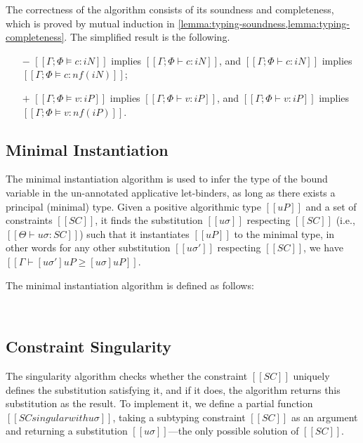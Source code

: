 \documentclass[acmsmall,natbib=false,review,anonymous]{acmart}
\begin{document}
The correctness of the algorithm consists of its soundness and 
completeness, which is proved by mutual
induction in \cref{lemma:typing-soundness,lemma:typing-completeness}.
The simplified result is the following.
\begin{theorempreview}
  \hfill
  \begin{itemize}
    \item [$-$] $[[Γ; Φ ⊨ c : iN]]$ implies $[[Γ; Φ ⊢ c : iN]]$, 
      and $[[Γ; Φ ⊢ c : iN]]$ implies $[[Γ; Φ ⊨ c : nf(iN)]]$;
    \item [$+$] $[[Γ; Φ ⊨ v : iP]]$ implies $[[Γ; Φ ⊢ v : iP]]$, 
      and $[[Γ; Φ ⊢ v : iP]]$ implies $[[Γ; Φ ⊨ v : nf(iP)]]$.
  \end{itemize}
\end{theorempreview}

\subsection{Minimal Instantiation}
The minimal instantiation algorithm is used
to infer the type of the bound variable in the un-annotated 
applicative let-binders, as long as there exists a principal
(minimal) type.  
Given a positive algorithmic type $[[uP]]$ 
and a set of constraints $[[SC]]$, it finds the substitution $[[uσ]]$
respecting $[[SC]]$ (i.e., $[[Θ ⊢ uσ : SC]]$) such that
it instantiates $[[uP]]$ to the minimal type, in other words 
for any other substitution $[[uσ']]$ respecting $[[SC]]$,
we have $[[Γ ⊢ [uσ']uP ≥ [uσ]uP]]$.

The minimal instantiation algorithm is defined as follows:
\begin{algorithm}
  \hfill \\
  \ottdefnSINGminInstLabeled{}
\end{algorithm}


\subsection{Constraint Singularity}
\label{sec:constraint-singularity}

The singularity algorithm checks whether the constraint $[[SC]]$
uniquely defines the substitution satisfying it, and if it does,
the algorithm returns this substitution as the result.
To implement it, we define a partial function $[[SC singular with uσ]]$,
taking a subtyping constraint $[[SC]]$ as an argument and returning a substitution 
$[[uσ]]$---the only possible solution of $[[SC]]$. 
\end{document}
